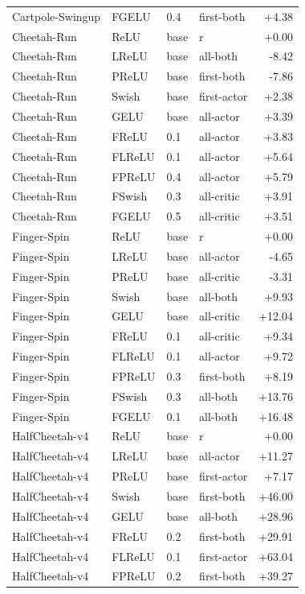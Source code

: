 {\begin{longtable}{llllr}
Cartpole-Swingup & FGELU & 0.4 & first-both & +4.38 \\
Cheetah-Run & ReLU & base & r & +0.00 \\
Cheetah-Run & LReLU & base & all-both & -8.42 \\
Cheetah-Run & PReLU & base & first-both & -7.86 \\
Cheetah-Run & Swish & base & first-actor & +2.38 \\
Cheetah-Run & GELU & base & all-actor & +3.39 \\
Cheetah-Run & FReLU & 0.1 & all-actor & +3.83 \\
Cheetah-Run & FLReLU & 0.1 & all-actor & +5.64 \\
Cheetah-Run & FPReLU & 0.4 & all-actor & +5.79 \\
Cheetah-Run & FSwish & 0.3 & all-critic & +3.91 \\
Cheetah-Run & FGELU & 0.5 & all-critic & +3.51 \\
Finger-Spin & ReLU & base & r & +0.00 \\
Finger-Spin & LReLU & base & all-actor & -4.65 \\
Finger-Spin & PReLU & base & all-critic & -3.31 \\
Finger-Spin & Swish & base & all-both & +9.93 \\
Finger-Spin & GELU & base & all-critic & +12.04 \\
Finger-Spin & FReLU & 0.1 & all-critic & +9.34 \\
Finger-Spin & FLReLU & 0.1 & all-actor & +9.72 \\
Finger-Spin & FPReLU & 0.3 & first-both & +8.19 \\
Finger-Spin & FSwish & 0.3 & all-both & +13.76 \\
Finger-Spin & FGELU & 0.1 & all-both & +16.48 \\
HalfCheetah-v4 & ReLU & base & r & +0.00 \\
HalfCheetah-v4 & LReLU & base & all-actor & +11.27 \\
HalfCheetah-v4 & PReLU & base & first-actor & +7.17 \\
HalfCheetah-v4 & Swish & base & first-both & +46.00 \\
HalfCheetah-v4 & GELU & base & all-both & +28.96 \\
HalfCheetah-v4 & FReLU & 0.2 & first-both & +29.91 \\
HalfCheetah-v4 & FLReLU & 0.1 & first-actor & +63.04 \\
HalfCheetah-v4 & FPReLU & 0.2 & first-both & +39.27 \\

\end{longtable}}
